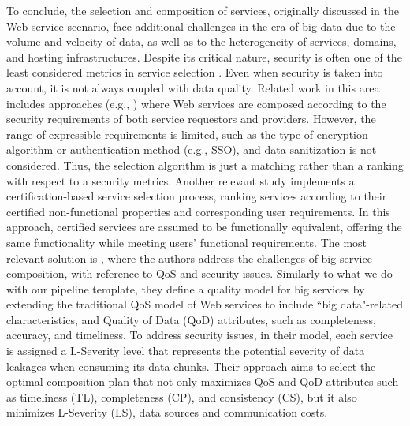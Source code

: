 To conclude, the selection and composition of services, originally discussed in the Web service scenario, face additional challenges in the era of big data due to the volume and velocity of data, as well as to the heterogeneity of services, domains, and hosting infrastructures. Despite its critical nature, security is often one of the least considered metrics in service selection \cite{SELLAMI2020102732}. Even when security is taken into account, it is not always coupled with data quality.
Related work in this area includes approaches (e.g., \cite{secureWScomposition}) where Web services are composed according to the security requirements of both service requestors and providers. However, the range of expressible requirements is limited, such as the type of encryption algorithm or authentication method (e.g., SSO), and data sanitization is not considered. Thus, the selection algorithm is just a matching rather than a ranking with respect to a security metrics.
Another relevant study \cite{9844845} implements a certification-based service selection process, ranking services according to their certified non-functional properties and corresponding user requirements. In this approach, certified services are assumed to be functionally equivalent, offering the same functionality while meeting users' functional requirements.
The most relevant solution is \cite{SELLAMI2020102732}, where the authors address the challenges of big service composition, with reference to QoS and security issues. Similarly to what we do with our pipeline template, they define a quality model for big services by extending the traditional QoS model of Web services to include ``big data"-related characteristics, and Quality of Data (QoD) attributes, such as completeness, accuracy, and timeliness. To address security issues, in their model, each service is assigned a L-Severity level \cite{Lseverity} that represents the potential severity of data leakages when consuming its data chunks.
Their approach aims to select the optimal composition plan that not only maximizes QoS and QoD attributes such as timeliness (TL), completeness (CP), and consistency (CS), but it also minimizes L-Severity (LS), data sources and communication costs.
